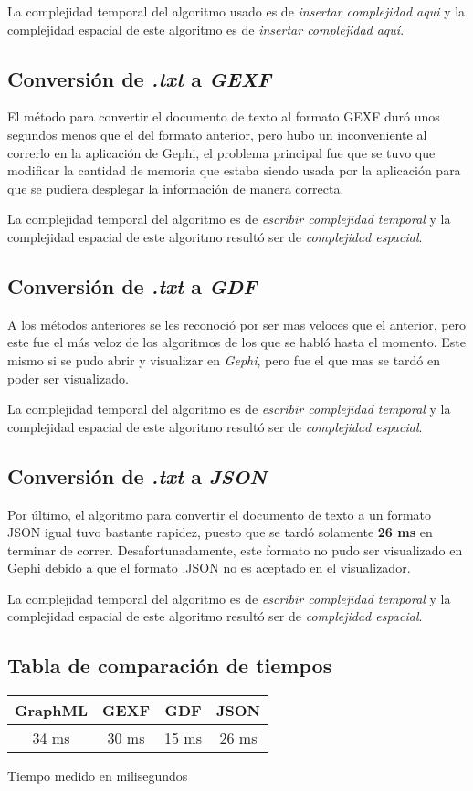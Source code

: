 \documentclass[acmsmall]{acmart}
\begin{document}
La complejidad temporal del algoritmo usado es de \textit{insertar complejidad aqui} y la complejidad espacial de este algoritmo es de \textit{insertar complejidad aquí}.

\subsection{Conversión de \textit{.txt} a \textit{GEXF}}
El método para convertir el documento de texto al formato GEXF duró unos segundos menos que el del formato anterior, pero hubo un inconveniente al correrlo en la aplicación de Gephi, el problema principal fue que se tuvo que modificar la cantidad de memoria que estaba siendo usada por la aplicación para que se pudiera desplegar la información de manera correcta.

La complejidad temporal del algoritmo es de \textit{escribir complejidad temporal} y la complejidad espacial de este algoritmo resultó ser de \textit{complejidad espacial}. 

\subsection{Conversión de \textit{.txt} a \textit{GDF}}
A los métodos anteriores se les reconoció por ser mas veloces que el anterior, pero este fue el más veloz de los algoritmos de los que se habló hasta el momento. Este mismo si se pudo abrir y visualizar en \textit{Gephi}, pero fue el que mas se tardó en poder ser visualizado.

La complejidad temporal del algoritmo es de \textit{escribir complejidad temporal} y la complejidad espacial de este algoritmo resultó ser de \textit{complejidad espacial}.

\subsection{Conversión de \textit{.txt} a \textit{JSON}}
Por último, el algoritmo para convertir el documento de texto a un formato JSON igual tuvo bastante rapidez, puesto que se tardó solamente \textbf{26 ms} en terminar de correr. Desafortunadamente, este formato no pudo ser visualizado en Gephi debido a que el formato .JSON no es aceptado en el visualizador.

La complejidad temporal del algoritmo es de \textit{escribir complejidad temporal} y la complejidad espacial de este algoritmo resultó ser de \textit{complejidad espacial}.

\subsection{Tabla de comparación de tiempos}
\begin{center}
 \begin{tabular}{||c c c c||} 
 \hline
 GraphML & GEXF & GDF & JSON \\ [0.5ex] 
 \hline\hline
     34 ms & 30 ms & 15 ms & 26 ms \\ [1ex] 
 \hline
\end{tabular}
\end{center}
\begin{center}
    Tiempo medido en milisegundos
\end{center}
\end{document}
